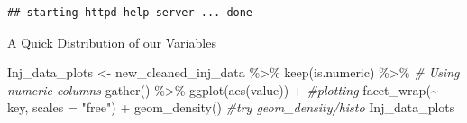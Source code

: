 \documentclass[
]{article}
\newenvironment{Shaded}{\begin{snugshade}}{\end{snugshade}}
\newcommand{\AttributeTok}[1]{\textcolor[rgb]{0.77,0.63,0.00}{#1}}
\newcommand{\CommentTok}[1]{\textcolor[rgb]{0.56,0.35,0.01}{\textit{#1}}}
\newcommand{\FunctionTok}[1]{\textcolor[rgb]{0.00,0.00,0.00}{#1}}
\newcommand{\NormalTok}[1]{#1}
\newcommand{\OtherTok}[1]{\textcolor[rgb]{0.56,0.35,0.01}{#1}}
\newcommand{\SpecialCharTok}[1]{\textcolor[rgb]{0.00,0.00,0.00}{#1}}
\newcommand{\StringTok}[1]{\textcolor[rgb]{0.31,0.60,0.02}{#1}}
\begin{document}
\begin{Shaded}
\end{Shaded}

\begin{verbatim}
## starting httpd help server ... done
\end{verbatim}

\begin{Shaded}
\end{Shaded}

A Quick Distribution of our Variables

\begin{Shaded}
\begin{Highlighting}[]
\NormalTok{Inj\_data\_plots }\OtherTok{\textless{}{-}}\NormalTok{ new\_cleaned\_inj\_data }\SpecialCharTok{\%\textgreater{}\%}
  \FunctionTok{keep}\NormalTok{(is.numeric) }\SpecialCharTok{\%\textgreater{}\%}                       \CommentTok{\# Using numeric columns}
  \FunctionTok{gather}\NormalTok{() }\SpecialCharTok{\%\textgreater{}\%}                                
  \FunctionTok{ggplot}\NormalTok{(}\FunctionTok{aes}\NormalTok{(value)) }\SpecialCharTok{+}                       \CommentTok{\#plotting}
    \FunctionTok{facet\_wrap}\NormalTok{(}\SpecialCharTok{\textasciitilde{}}\NormalTok{ key, }\AttributeTok{scales =} \StringTok{"free"}\NormalTok{) }\SpecialCharTok{+}
    \FunctionTok{geom\_density}\NormalTok{()                         }\CommentTok{\#try geom\_density/histo}
\NormalTok{Inj\_data\_plots}
\end{Highlighting}
\end{Shaded}
\end{document}

